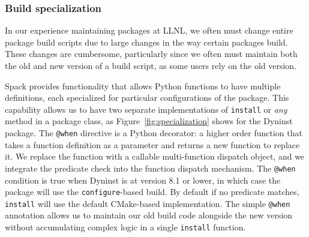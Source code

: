 \subsubsection{Build specialization}

In our experience maintaining packages at LLNL, we often must change
entire package build scripts due to large changes in the way certain packages build.
These changes are cumbersome, particularly since we often must maintain both 
the old and new version of a build script, as some users rely on the old version.


%

Spack provides functionality that allows Python functions to have
multiple definitions, each specialized for particular configurations of the package.
This capability allows us to have two separate implementations of {\tt install} or {\it any} method
in a package class, as Figure~\ref{fig:specialization} shows for the Dyninst
package.  The {\tt @when} directive is a Python decorator: a higher order function that
takes a function definition as a parameter and returns a new function to replace it.
We replace the function with a callable multi-function dispatch object, and we
integrate the predicate check into the function dispatch mechanism.  The
{\tt @when} condition is true when Dyninst is at version 8.1 or lower, in which
case the package will use the {\tt configure}-based build.  By default if no predicate matches,
{\tt install} will use the default CMake-based implementation. The simple {\tt @when}
annotation allows us to maintain our old build code alongside the new version without
accumulating complex logic in a single {\tt install} function.
